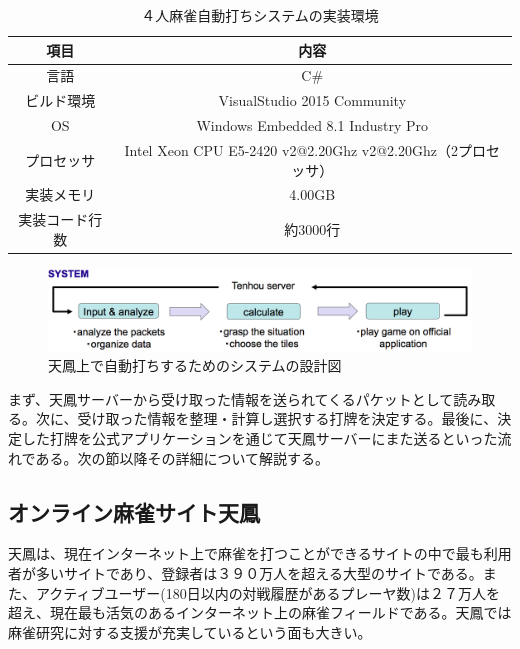 

\begin{table}[h]
  \caption{４人麻雀自動打ちシステムの実装環境}
  \label{imp1}
  \begin{center}
  \begin{tabular}{c|c}
    \hline
    項目  & 内容 \\\hline\hline
    言語  & C\# \\\hline
    ビルド環境  & VisualStudio 2015 Community\\\hline
    OS & Windows Embedded 8.1 Industry Pro \\\hline
    プロセッサ & Intel Xeon CPU E5-2420 v2@2.20Ghz v2@2.20Ghz（2プロセッサ）\\\hline
    実装メモリ & 4.00GB\\\hline
    実装コード行数 & 約3000行
  \end{tabular}\end{center}
\end{table}


\begin{figure}[h]
 \centering
 \includegraphics[keepaspectratio, scale=0.4
 ,bb=0 0 1226 243]
      {img/imp1.png}
 \caption{天鳳上で自動打ちするためのシステムの設計図}
 \label{2flow}
\end{figure}

まず、天鳳サーバーから受け取った情報を送られてくるパケットとして読み取る。次に、受け取った情報を整理・計算し選択する打牌を決定する。最後に、決定した打牌を公式アプリケーションを通じて天鳳サーバーにまた送るといった流れである。次の節以降その詳細について解説する。

\subsection{オンライン麻雀サイト天鳳}
天鳳は、現在インターネット上で麻雀を打つことができるサイトの中で最も利用者が多いサイトであり、登録者は３９０万人を超える大型のサイトである。また、アクティブユーザー(180日以内の対戦履歴があるプレーヤ数)は２７万人を超え、現在最も活気のあるインターネット上の麻雀フィールドである。天鳳では麻雀研究に対する支援が充実しているという面も大きい。

